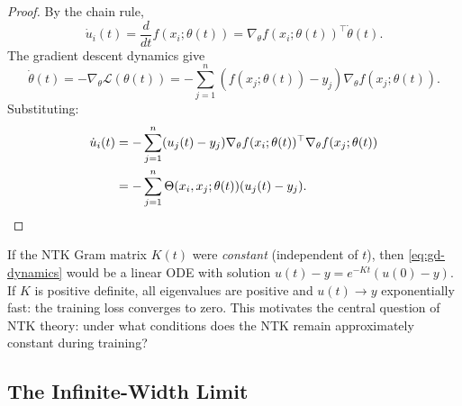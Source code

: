 \documentclass[11pt,a4paper]{article}
\begin{document}
\begin{proof}
By the chain rule,
\[
  \dot{u}_i(t) = \frac{d}{dt} f(x_i; \theta(t))
  = \nabla_\theta f(x_i; \theta(t))^\top \dot{\theta}(t).
\]
The gradient descent dynamics give
\[
  \dot{\theta}(t) = -\nabla_\theta \mathcal{L}(\theta(t))
  = -\sum_{j=1}^{n} (f(x_j; \theta(t)) - y_j)
    \nabla_\theta f(x_j; \theta(t)).
\]
Substituting:
\begin{align*}
  \dot{u}_i(t)
  &= -\sum_{j=1}^{n} (u_j(t) - y_j)
    \nabla_\theta f(x_i; \theta(t))^\top
    \nabla_\theta f(x_j; \theta(t)) \\
  &= -\sum_{j=1}^{n} \Theta(x_i, x_j; \theta(t))
    (u_j(t) - y_j). \qedhere
\end{align*}
\end{proof}

\begin{remark}
\label{rem:kernel-regression-ode}
If the NTK Gram matrix $K(t)$ were \emph{constant} (independent of
$t$), then \eqref{eq:gd-dynamics} would be a linear ODE with solution
$u(t) - y = e^{-Kt}(u(0) - y)$.  If $K$ is positive definite, all
eigenvalues are positive and $u(t) \to y$ exponentially fast: the
training loss converges to zero.  This motivates the central question
of NTK theory: under what conditions does the NTK remain approximately
constant during training?
\end{remark}

\subsection{The Infinite-Width Limit}
\end{document}
